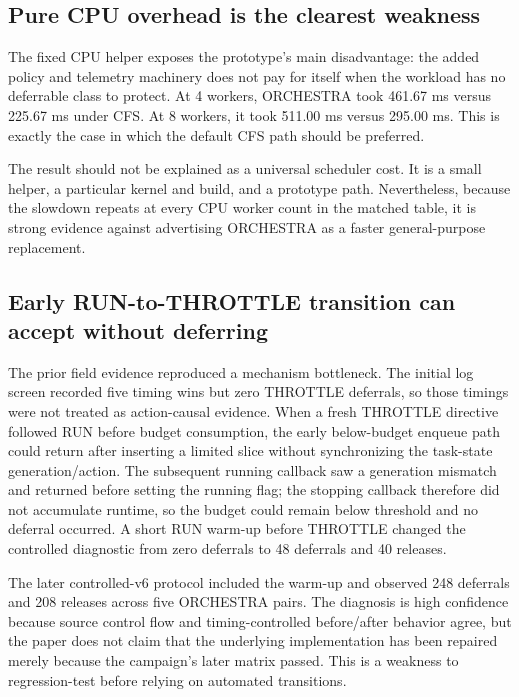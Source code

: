 \documentclass[10pt,letterpaper,twocolumn]{article}
\begin{document}
\subsection{Pure CPU overhead is the clearest weakness}

The fixed CPU helper exposes the prototype's main disadvantage: the added policy and telemetry machinery does not pay for itself when the workload has no deferrable class to protect. At 4 workers, ORCHESTRA took 461.67 ms versus 225.67 ms under CFS. At 8 workers, it took 511.00 ms versus 295.00 ms. This is exactly the case in which the default CFS path should be preferred.

The result should not be explained as a universal scheduler cost. It is a small helper, a particular kernel and build, and a prototype path. Nevertheless, because the slowdown repeats at every CPU worker count in the matched table, it is strong evidence against advertising ORCHESTRA as a faster general-purpose replacement.

\subsection{Early RUN-to-THROTTLE transition can accept without deferring}

The prior field evidence reproduced a mechanism bottleneck. The initial log screen recorded five timing wins but zero THROTTLE deferrals, so those timings were not treated as action-causal evidence. When a fresh THROTTLE directive followed RUN before budget consumption, the early below-budget enqueue path could return after inserting a limited slice without synchronizing the task-state generation/action. The subsequent running callback saw a generation mismatch and returned before setting the running flag; the stopping callback therefore did not accumulate runtime, so the budget could remain below threshold and no deferral occurred. A short RUN warm-up before THROTTLE changed the controlled diagnostic from zero deferrals to 48 deferrals and 40 releases.

The later controlled-v6 protocol included the warm-up and observed 248 deferrals and 208 releases across five ORCHESTRA pairs. The diagnosis is high confidence because source control flow and timing-controlled before/after behavior agree, but the paper does not claim that the underlying implementation has been repaired merely because the campaign's later matrix passed. This is a weakness to regression-test before relying on automated transitions.
\end{document}
